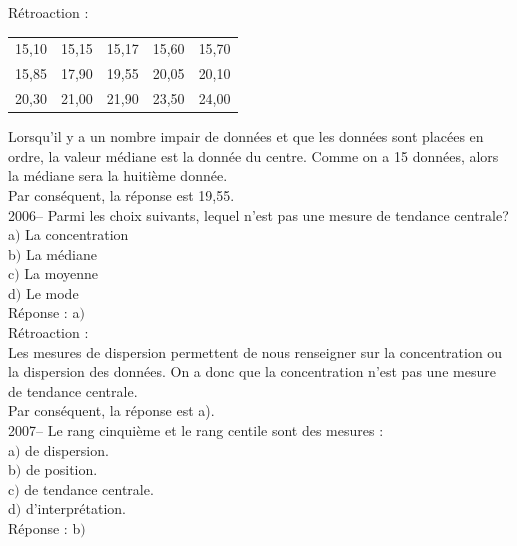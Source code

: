 \documentclass[letterpaper, 12pt]{article}
\begin{document}
R\'etroaction :\\
\begin{center}

\begin{tabular}{|c  c  c  c  c|} \hline

15,10 & 15,15 & 15,17 & 15,60 & 15,70 \\
15,85 & 17,90 & 19,55 & 20,05 & 20,10 \\
20,30 & 21,00 & 21,90 & 23,50 & 24,00 \\ \hline

\end{tabular}
\end{center}
Lorsqu'il y a un nombre impair de donn\'ees et que les donn\'ees sont plac\'ees en ordre, la valeur m\'ediane est la donn\'ee du centre. Comme on a 15 donn\'ees, alors la m\'ediane sera la huiti\`eme donn\'ee.\\
Par cons\'equent, la r\'eponse est 19,55.\\


2006-- Parmi les choix suivants, lequel n'est pas une mesure de tendance centrale?\\

a$)$ La concentration\\
b$)$ La m\'ediane\\
c$)$ La moyenne\\
d$)$ Le mode\\

R\'eponse : a$)$\\

R\'etroaction :\\
Les mesures de dispersion permettent de nous renseigner sur la concentration ou la dispersion des donn\'ees. On a donc que la concentration n'est pas une mesure de tendance centrale.\\
Par cons\'equent, la r\'eponse est a).\\

2007-- Le rang cinqui\`eme et le rang centile sont des mesures : \\

a$)$ de dispersion.\\
b$)$ de position.\\
c$)$ de tendance centrale.\\
d$)$ d'interpr\'etation.\\

R\'eponse : b$)$\\
\end{document}
